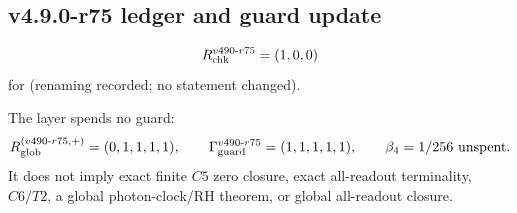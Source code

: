 \subsection*{v4.9.0-r75 ledger and guard update}
\label{subsec:v490-r75-ledger-guard}

\[
R_{\rm chk}^{v490\text{-}r75}=(1,0,0)
\]
for (renaming recorded; no statement changed).

The layer spends no guard:
\[
R_{\rm glob}^{(v490\text{-}r75,+)}=(0,1,1,1,1),
\qquad
\Gamma_{\rm guard}^{v490\text{-}r75}=(1,1,1,1,1),
\qquad
\beta_4=1/256\ \text{unspent}.
\]
It does not imply exact finite \(C5\) zero closure, exact all-readout terminality,
\(C6/T2\), a global photon-clock/RH theorem, or global all-readout closure.
